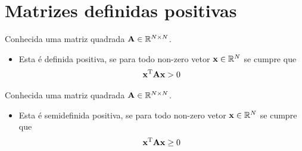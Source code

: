 \section{ Matrizes definidas positivas}


\begin{definition}\label{def:positivematrix0}
Conhecida uma matriz quadrada $\MATRIX{A} \in \mathbb{R}^{N \times N}$. 
\begin{itemize}
\item Esta é definida positiva, se para todo non-zero vetor $\VECTOR{x} \in \mathbb{R}^N$
se cumpre que \cite[pp. 159]{golub2013matrix} 
\begin{equation}
\VECTOR{x}^{\transpose} \MATRIX{A} \VECTOR{x} > 0
\end{equation}
\end{itemize}
\end{definition}



\begin{definition}\label{def:semipositivematrix0}
Conhecida uma matriz quadrada $\MATRIX{A} \in \mathbb{R}^{N \times N}$. 
\begin{itemize}
\item Esta é semidefinida positiva, se para todo non-zero vetor $\VECTOR{x} \in \mathbb{R}^N$
se cumpre que \cite[pp. 159]{golub2013matrix} 
\begin{equation}
\VECTOR{x}^{\transpose} \MATRIX{A} \VECTOR{x} \geq 0
\end{equation}
\end{itemize}
\end{definition}



